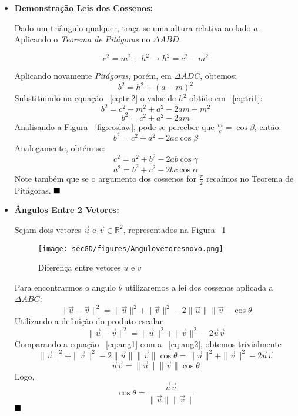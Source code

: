 \begin{itemize}
	\item \textbf{Demonstração Leis dos Cossenos:}
	
	Dado um triângulo qualquer, traça-se uma altura relativa ao lado $a$. Aplicando o \textit{Teorema de Pitágoras} no $\Delta ABD$:
	
	\begin{equation}
	c^{2}=m^{2}+h^{2} \rightarrow h^{2}=c^{2}-m^{2}
	\label{eq:tri1}
	\end{equation}
	
	Aplicando novamente \textit{Pitágoras}, porém, em $\Delta ADC$, obtemos:
	\begin{equation}
	b^{2}=h^{2}+(a-m)^{2}
	\label{eq:tri2}
	\end{equation}
	Substituindo na equação ~\ref{eq:tri2} o valor de $h^{2}$ obtido em ~\ref{eq:tri1}:
	$$
	b^{2}=c^{2}-m^{2}+a^{2}-2am+m^{2}
	$$
	$$
	b^{2}=c^{2}+a^{2}-2am
	$$
	Analisando a 
	Figura ~\ref{fig:coslaw}, pode-se perceber que $\frac{m}{c}=\cos\beta$, então:
	$$
	b^{2}=c^{2}+a^{2}-2ac\cos\beta
	$$
	Analogamente, obtém-se:
	$$
	c^{2}=a^{2}+b^{2}-2ab\cos\gamma
	$$
	$$
	a^{2}=b^{2}+c^{2}-2bc\cos\alpha
	$$
	Note também que se o argumento dos cossenos for $\frac{\pi}{2}$ recaímos no Teorema de Pitágoras. $\hfill\blacksquare$
	\item \textbf{Ângulos Entre 2 Vetores:}
	
	Sejam dois vetores $\overrightarrow{u}$ e $\overrightarrow{v} \in \mathbb{R}^2$, representados na Figura ~\ref{fig:diffbtvet}
	\begin{figure}[H]
		\begin{center}
			\texttt{[image: secGD/figures/Angulovetoresnovo.png]}
		\end{center}
		\caption{Diferença entre vetores $u$ e $v$}
		\label{fig:diffbtvet}
	\end{figure}
	Para encontrarmos o angulo $\theta$ utilizaremos a lei dos cossenos aplicada a $\Delta ABC$:
	\begin{equation}
	\|\overrightarrow{u}-\overrightarrow{v}\|^{2}=\|\overrightarrow{u}\|^{2} + \|\overrightarrow{v}\|^{2} - 2\|\overrightarrow{u}\|\|\overrightarrow{v}\|\cos\theta
	\label{eq:ang1}
	\end{equation}
	Utilizando a definição do produto escalar \cite{GASteinbruch}
	\begin{equation}
	\|\overrightarrow{u}-\overrightarrow{v}\|^{2}=\|\overrightarrow{u}\|^{2} + \|\overrightarrow{v}\|^{2} - 2\overrightarrow{u}\overrightarrow{v}
	\label{eq:ang2}
	\end{equation}
	Comparando a equação ~\ref{eq:ang1} com a ~\ref{eq:ang2}, obtemos trivialmente
	$$
	\|\overrightarrow{u}\|^{2} + \|\overrightarrow{v}\|^{2} - 2\|\overrightarrow{u}\|\|\overrightarrow{v}\|\cos\theta = \|\overrightarrow{u}\|^{2} + \|\overrightarrow{v}\|^{2} - 2\overrightarrow{u}\overrightarrow{v}
	$$
	$$
	\overrightarrow{u}\overrightarrow{v} = \|\overrightarrow{u}\|\|\overrightarrow{v}\|\cos\theta
	$$
	Logo,
	$$
	\cos\theta = \frac{\overrightarrow{u}\overrightarrow{v}}{\|\overrightarrow{u}\|\|\overrightarrow{v}\|} 
	$$
	$\hfill\blacksquare$
\end{itemize}